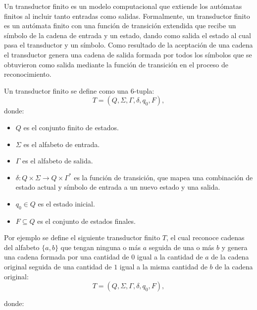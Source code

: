 \documentclass[12pt]{article}
\begin{document}
Un transductor finito \cite{geeksforgeeks_finite_state_transducer} es un modelo computacional que extiende los autómatas finitos al incluir tanto entradas como salidas.  
Formalmente, un transductor finito es un autómata finito con una función de transición extendida que recibe un símbolo de la cadena de entrada y un estado, dando como
salida el estado al cual pasa el transductor y un símbolo. Como resultado de la aceptación de una cadena el transductor
genera una cadena de salida formada por todos los símbolos que se obtuvieron como salida mediante la función de transición
en el proceso de reconocimiento.

Un transductor finito se define como una 6-tupla:
\[
      T = (Q, \Sigma, \Gamma, \delta, q_0, F),
\]
donde:
\begin{itemize}
      \item \(Q\) es el conjunto finito de estados.
      \item \(\Sigma\) es el alfabeto de entrada.
      \item \(\Gamma\) es el alfabeto de salida.
      \item \(\delta: Q \times \Sigma \to Q \times \Gamma^*\) es la función de transición, que mapea una combinación de estado actual y símbolo de entrada a un nuevo estado y una salida.
      \item \(q_0 \in Q\) es el estado inicial.
      \item \(F \subseteq Q\) es el conjunto de estados finales.
\end{itemize}

Por ejemplo se define el siguiente transductor finito $T$, el cual reconoce cadenas del alfabeto $\{a,b\}$
que tengan ninguna o más $a$ seguida de una o más $b$ y genera una cadena formada por una cantidad de $0$ igual
a la cantidad de $a$ de la cadena original seguida de una cantidad de $1$ igual a la misma cantidad de $b$ de
la cadena original:
\[
      T = (Q, \Sigma, \Gamma, \delta, q_0, F),
\]

donde:
\end{document}
